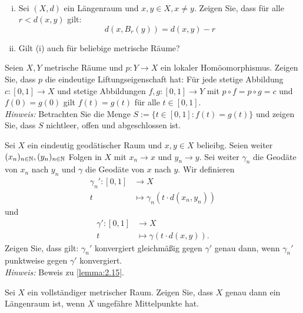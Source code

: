 	\begin{aufgabe}
		\label{aufg:5.1}	
		\mbox{} \\[-1.3cm]
		\begin{enumerate}[(i)]
			\item Sei $(X,d)$ ein Längenraum und $x,y \in X, x \neq y$.
			Zeigen Sie, dass für alle $r < d(x,y)$ gilt:
			\[
				d(x,B_r(y)) = d(x,y) - r
			\]
			\item Gilt (i) auch für beliebige metrische Räume?
		\end{enumerate}
	\end{aufgabe}
	
	\begin{aufgabe}
		\label{aufg:5.2}	
		Seien $X,Y$ metrische Räume und $p \colon Y \rightarrow X$ ein lokaler Homöomorphismus.
		Zeigen Sie, dass $p$ die eindeutige Liftungseigenschaft hat:
		Für jede stetige Abbildung $c \colon [0,1] \rightarrow X$ und stetige Abbildungen $f,g \colon [0,1] \rightarrow Y$ mit $p \circ f = p \circ g = c$ und $f(0) = g(0)$ gilt $f(t) = g(t)$ für alle $t \in [0,1]$. \\
		\textit{Hinweis:} Betrachten Sie die Menge $S:= \{t \in [0,1] : f(t) = g(t)\}$ und zeigen Sie, dass $S$ nichtleer, offen und abgeschlossen ist.
	\end{aufgabe}
	
	\begin{aufgabe}
		\label{aufg:5.3}	
		Sei $X$ ein eindeutig geodätischer Raum und $x,y \in X$ belieibg.
		Seien weiter $(x_n)_{n \in \mathbb{N}}, (y_n)_{n \in \mathbb{N}}$ Folgen in $X$ mit $x_n \rightarrow x$ und $y_n \rightarrow y$.
		Sei weiter $\gamma_n$ die Geodäte von $x_n$ nach $y_n$ und $\gamma$ die Geodäte von $x$ nach $y$.
		Wir definieren
		\begin{align*}
			\gamma_n'\colon [0,1] &\longrightarrow X \\
			t &\longmapsto \gamma_n(t \cdot d(x_n,y_n))
		\end{align*}
		und
		\begin{align*}
			\gamma'\colon [0,1] &\longrightarrow X \\
			t &\longmapsto \gamma(t \cdot d(x,y)).
		\end{align*}
		Zeigen Sie, dass gilt:
		$\gamma_n'$ konvergiert gleichmäßig gegen $\gamma'$ genau dann, wenn $\gamma_n'$ punktweise gegen $\gamma'$ konvergiert. \\
		\textit{Hinweis:} Beweis zu \autoref{lemma:2.15}.
	\end{aufgabe}

	\begin{aufgabe}
		\label{aufg:5.4}	
		Sei $X$ ein vollständiger metrischer Raum.
		Zeigen Sie, dass $X$ genau dann ein Längenraum ist, wenn $X$ ungefähre Mittelpunkte hat.
	\end{aufgabe}
	
